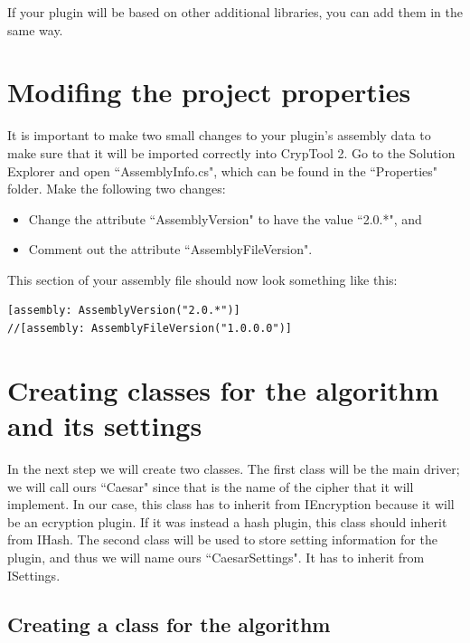 If your plugin will be based on other additional libraries, you can add them in the same way.

\section{Modifing the project properties}
\label{sec:ModifyTheProjectProperties}

It is important to make two small changes to your plugin's assembly data to make sure that it will be imported correctly into CrypTool 2. Go to the Solution Explorer and open ``AssemblyInfo.cs", which can be found in the ``Properties" folder. Make the following two changes:

\begin{itemize}
	\item Change the attribute ``AssemblyVersion" to have the value ``2.0.*", and
	\item Comment out the attribute ``AssemblyFileVersion".
\end{itemize}

This section of your assembly file should now look something like this:

\begin{lstlisting}
[assembly: AssemblyVersion("2.0.*")]
//[assembly: AssemblyFileVersion("1.0.0.0")]
\end{lstlisting}

\section{Creating classes for the algorithm and its settings}
\label{sec:CreatingClassesForTheAlgorithmAndItsSettings}

In the next step we will create two classes. The first class will be the main driver; we will call ours ``Caesar" since that is the name of the cipher that it will implement. In our case, this class has to inherit from IEncryption because it will be an ecryption plugin. If it was instead a hash plugin, this class should inherit from IHash. The second class will be used to store setting information for the plugin, and thus we will name ours ``CaesarSettings". It has to inherit from ISettings.
\clearpage

\subsection{Creating a class for the algorithm}
\label{sec:CreatingAClassForTheAlgorithm}

